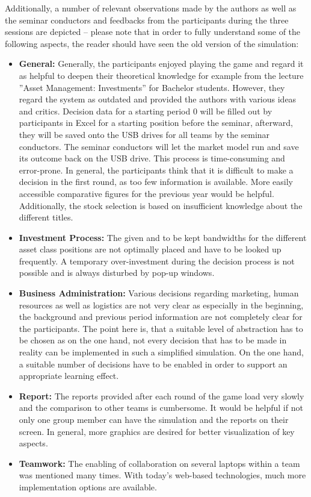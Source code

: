 Additionally, a number of relevant observations made by the authors as well as the seminar conductors and feedbacks from the participants during the three sessions are depicted – please note that in order to fully understand some of the following aspects, the reader should have seen the old version of the simulation:
\begin{itemize}
  \item \textbf{General:} Generally, the participants enjoyed playing the game and regard it as helpful to deepen their theoretical knowledge for example from the lecture ''Asset Management: Investments'' for Bachelor students. However, they regard the system as outdated and provided the authors with various ideas and critics. Decision data for a starting period 0 will be filled out by participants in Excel for a starting position before the seminar, afterward, they will be saved onto the USB drives for all teams by the seminar conductors. The seminar conductors will let the market model run and save its outcome back on the USB drive. This process is time-consuming and error-prone. In general, the participants think that it is difficult to make a decision in the first round, as too few information is available. More easily accessible comparative figures for the previous year would be helpful. Additionally, the stock selection is based on insufficient knowledge about the different titles.
  \item \textbf{Investment Process:} The given and to be kept bandwidths for the different asset class positions are not optimally placed and have to be looked up frequently. A temporary over-investment during the decision process is not possible and is always disturbed by pop-up windows.
  \item \textbf{Business Administration:} Various decisions regarding marketing, human resources as well as logistics are not very clear as especially in the beginning, the background and previous period information are not completely clear for the participants. The point here is, that a suitable level of abstraction has to be chosen as on the one hand, not every decision that has to be made in reality can be implemented in such a simplified simulation. On the one hand, a suitable number of decisions have to be enabled in order to support an appropriate learning effect.
  \item \textbf{Report:} The reports provided after each round of the game load very slowly and the comparison to other teams is cumbersome. It would be helpful if not only one group member can have the simulation and the reports on their screen. In general, more graphics are desired for better visualization of key aspects.
  \item \textbf{Teamwork:} The enabling of collaboration on several laptops within a team was mentioned many times. With today’s web-based technologies, much more implementation options are available.
\end{itemize}


